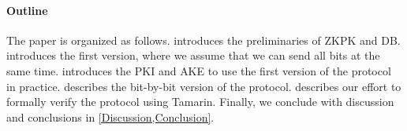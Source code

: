 \paragraph*{Outline}

The paper is organized as follows.
 introduces the preliminaries of \ac{ZKPK} and \ac{DB}.
 introduces the first version, where we assume that we can 
send all bits at the same time.
 introduces the \ac{PKI} and \ac{AKE} to use the first 
version of the protocol in practice.
 describes the bit-by-bit version of the protocol.
 describes our effort to formally verify the protocol 
using Tamarin.
Finally, we conclude with discussion and conclusions in 
\cref{Discussion,Conclusion}.
